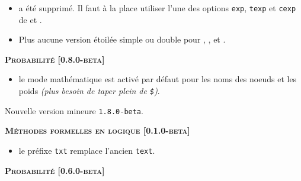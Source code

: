 \documentclass[12pt,a4paper]{book}
\begin{document}
\begin{description}
\begin{itemize}[itemsep=.5em]
\begin{itemize}[itemsep=.5em]
        \item {} a été supprimé. Il faut à la place utiliser l'une des options \verb#exp#, \verb#texp# et \verb#cexp# de  et .

        \item Plus aucune version étoilée simple ou double pour , ,  et .
    \end{itemize}


\end{itemize}


\separation




\begin{center}
    \textbf{\textsc{Probabilité [0.8.0-beta]}}
\end{center}

\begin{itemize}[itemsep=.5em]
    \item {}
          le mode mathématique est activé par défaut pour les noms des noeuds et les poids \emph{(plus besoin de taper plein de \texttt{\$})}.
\end{itemize}


\separation

\end{description}\begin{description}
\medskip
\item[2020-08-09] Nouvelle version mineure \verb+1.8.0-beta+.




\begin{center}
    \textbf{\textsc{Méthodes formelles en logique [0.1.0-beta]}}
\end{center}

\begin{itemize}[itemsep=.5em]
    \item {}
          le préfixe \verb#txt# remplace l'ancien \verb#text#.
\end{itemize}


\separation




\begin{center}
    \textbf{\textsc{Probabilité [0.6.0-beta]}}
\end{center}


\end{description}
\end{document}
